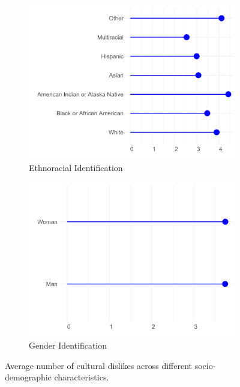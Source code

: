 \documentclass[12pt]{article}
\begin{document}
\begin{figure}[ht!]
\begin{subfigure}[b]{0.3\textwidth}
        \includegraphics[width=1.0\textwidth]{Plots/uni-dist-grd-int-rac.png}
            \caption{Ethnoracial Identification}
            \label{fig:grd-int-rac}
    \end{subfigure}
     \begin{subfigure}[b]{0.3\textwidth}
        \includegraphics[width=1.0\textwidth]{Plots/uni-dist-grd-int-gen.png}
            \caption{Gender Identification}
            \label{fig:grd-int-gen}
    \end{subfigure}
    \caption{Average number of cultural dislikes across different socio-demographic characteristics.}
    \label{fig:grd-int}
\end{figure}
\newpage


\end{document}
